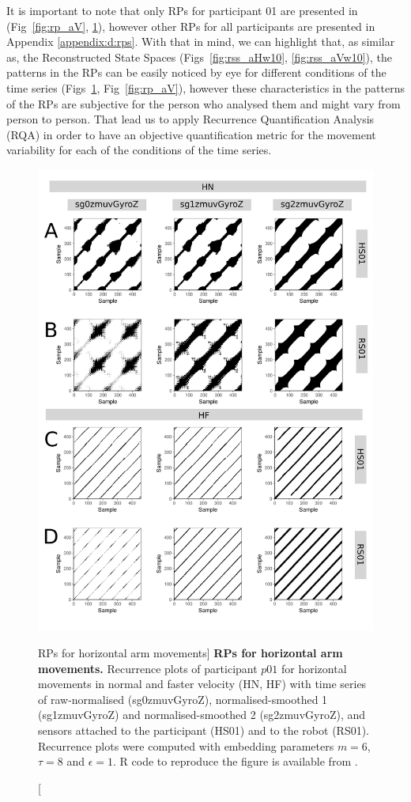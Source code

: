 It is important to note that only RPs for participant 01 are presented
in (Fig~\ref{fig:rp_aV}, \ref{fig:rp_aH}), however
other RPs for all participants are presented in Appendix \ref{appendix:d:rps}.
With that in mind, we can highlight that, as similar as, the 
Reconstructed State Spaces (Figs~\ref{fig:rss_aHw10}, \ref{fig:rss_aVw10}), 
the patterns in the RPs can be easily noticed by eye for different conditions 
of the time series (Figs~\ref{fig:rp_aH}, Fig~\ref{fig:rp_aV}),
however these characteristics in the patterns of the RPs are subjective 
for the person who analysed them and might vary from person to person. 
That lead us to apply Recurrence Quantification Analysis (RQA) in order 
to have an objective quantification metric for the movement variability 
for each of the conditions of the time series.
\begin{figure}
\centering
\includegraphics[height=0.80\textheight]{rp_aH}
\caption
	[RPs for horizontal arm movements]{
	{\bf RPs for horizontal arm movements.}	
	Recurrence plots %
	of participant $p01$ for horizontal movements in normal and faster 
	velocity (HN, HF) with time series of raw-normalised (sg0zmuvGyroZ), 
	normalised-smoothed 1 (sg1zmuvGyroZ) and 
	normalised-smoothed 2 (sg2zmuvGyroZ), and 
	sensors attached to the participant (HS01) and to the robot (RS01).
	Recurrence plots were computed with 
	embedding parameters $m=6$, $\tau=8$ and $\epsilon=1$.
	R code to reproduce the figure is available from \cite{hwum2018}.
        }
    \label{fig:rp_aH}
\end{figure}
